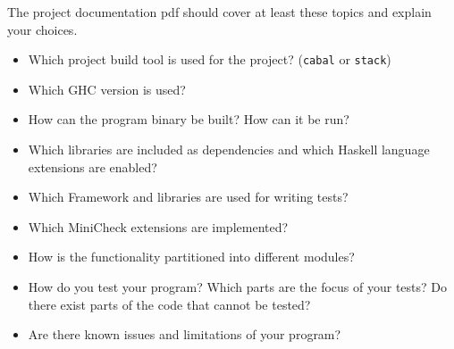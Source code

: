 \documentclass{article}
\begin{document}
The project documentation pdf should cover at least these topics and explain your choices.
\begin{itemize}
\item Which project build tool is used for the project? (\texttt{cabal} or \texttt{stack})
\item Which GHC version is used?
\item How can the program binary be built? How can it be run?
\item Which libraries are included as dependencies and which Haskell language extensions are enabled?
\item Which Framework and libraries are used for writing tests?
\item Which MiniCheck extensions are implemented?
\item How is the functionality partitioned into different modules?
\item How do you test your program? Which parts are the focus of your tests? Do there exist parts of the code that cannot be tested?
\item Are there known issues and limitations of your program?
\end{itemize}

\vspace*{1cm}

\printbibliography
\end{document}
